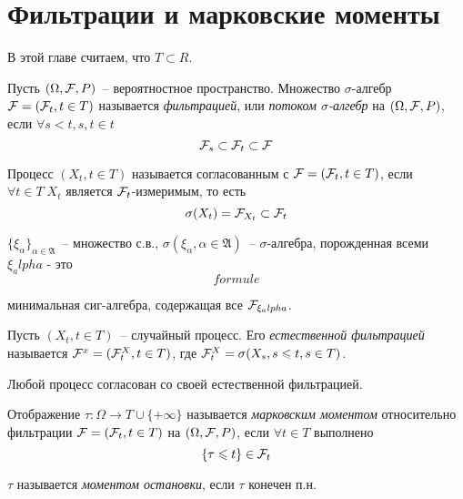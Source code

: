 \section{Фильтрации и марковские моменты}
В этой главе считаем, что $T \subset R$.

\begin{definition}
Пусть $(\Omega, \mathcal{F}, P)$~-- вероятностное пространство. Множество
$\sigma$-алгебр $\mathcal{F} = (\mathcal{F}_t, t \in T)$ называется \emph{фильтрацией},
или \emph{потоком $\sigma$-алгебр} на $(\Omega, \mathcal{F}, P)$, если $\forall s < t, s, t \in t$
$$\mathcal{F}_s \subset \mathcal{F}_t \subset \mathcal{F}$$
\end{definition}
\begin{definition}
Процесс $(X_t, t \in T)$ называется согласованным с $\mathcal{F} = (\mathcal{F}_t, t \in T)$, если
$\forall t \in T \; X_t$ является $\mathcal{F}_t$-измеримым, то есть
$$\sigma(X_t) = \mathcal{F}_{X_t} \subset \mathcal{F}_t$$
\end{definition}


\newcommand{\Alpha}{\mathfrak{A}}

\begin{definition}[обозначения]
$\{\xi_\alpha\}_{\alpha \in \Alpha}$~-- множество с.в., $\sigma(\xi_\alpha, \alpha \in \Alpha)$~--
$\sigma$-алгебра, порожденная всеми $\xi_alpha$ -  это
$$formule$$

минимальная сиг-алгебра, содержащая все $\mathcal{F}_{\xi_alpha}$.
\end{definition}

\begin{definition}
Пусть $(X_t, t \in T)$~-- случайный процесс. Его \emph{естественной фильтрацией} называется
$\mathcal{F}^x = (\mathcal{F}_t^X, t \in T)$, где $\mathcal{F}_t^X = \sigma(X_s, s \leqslant t, s \in T)$.
\end{definition}
\begin{remark}[наблюдение]
Любой процесс согласован со своей естественной фильтрацией.
\end{remark}

\begin{definition}
Отображение $\tau: \Omega \to T \cup \{+\infty\}$ называется
\emph{марковским моментом} относительно фильтрации $\mathcal{F} = (\mathcal{F}_t, t \in T)$
на $(\Omega, \mathcal{F}, P)$, если $\forall t \in T$ выполнено
$$\{\tau \leqslant t\} \in \mathcal{F}_t$$

$\tau$ называется \emph{моментом остановки}, если $\tau$ конечен п.н.
\end{definition}

